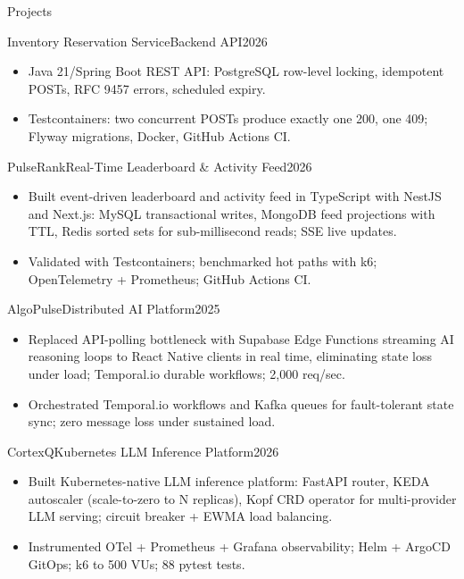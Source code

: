 \documentclass[]{mcdowellcv}
\begin{document}
\begin{cvsection}{Projects}
  \begin{cvsubsection}{Inventory Reservation Service}{Backend API}{2026}
    \begin{itemize}
      \item Java 21/Spring Boot REST API: PostgreSQL row-level locking, idempotent POSTs, RFC 9457 errors, scheduled expiry.
      \item Testcontainers: two concurrent POSTs produce exactly one 200, one 409; Flyway migrations, Docker, GitHub Actions CI.
    \end{itemize}
    \vspace{-1.5pt}
  \end{cvsubsection}

  \begin{cvsubsection}{PulseRank}{Real-Time Leaderboard \& Activity Feed}{2026}
    \begin{itemize}
      \item Built event-driven leaderboard and activity feed in TypeScript with NestJS and Next.js: MySQL transactional writes, MongoDB feed projections with TTL, Redis sorted sets for sub-millisecond reads; SSE live updates.
      \item Validated with Testcontainers; benchmarked hot paths with k6; OpenTelemetry + Prometheus; GitHub Actions CI.
    \end{itemize}
    \vspace{-1.5pt}
  \end{cvsubsection}

  \begin{cvsubsection}{AlgoPulse}{Distributed AI Platform}{2025}
    \begin{itemize}
      \item Replaced API-polling bottleneck with Supabase Edge Functions streaming AI reasoning loops to React Native clients in real time, eliminating state loss under load; Temporal.io durable workflows; 2,000 req/sec.
      \item Orchestrated Temporal.io workflows and Kafka queues for fault-tolerant state sync; zero message loss under sustained load.
    \end{itemize}
    \vspace{-1.5pt}
  \end{cvsubsection}

  \begin{cvsubsection}{CortexQ}{Kubernetes LLM Inference Platform}{2026}
    \begin{itemize}
      \item Built Kubernetes-native LLM inference platform: FastAPI router, KEDA autoscaler (scale-to-zero to N replicas), Kopf CRD operator for multi-provider LLM serving; circuit breaker + EWMA load balancing.
      \item Instrumented OTel + Prometheus + Grafana observability; Helm + ArgoCD GitOps; k6 to 500 VUs; 88 pytest tests.
    \end{itemize}
  \end{cvsubsection}
\end{cvsection}
\end{document}
